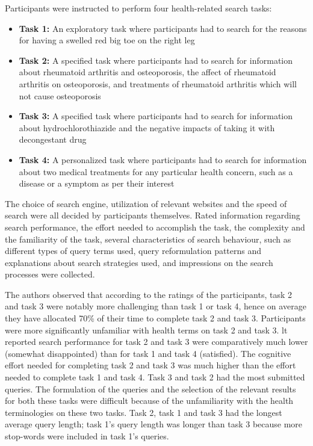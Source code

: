 \documentclass[]{article}
\begin{document}
\begin{enumerate}
Participants were instructed to perform four health-related search tasks: 

\begin{itemize}
	\item \textbf{Task 1:} An exploratory task where participants had to search for the reasons for having a swelled red big toe on the right leg
	
	\item \textbf{Task 2:} A specified task where participants had to search for information about rheumatoid arthritis and osteoporosis, the affect of rheumatoid arthritis on osteoporosis, and treatments of rheumatoid arthritis which will not cause osteoporosis
	
	\item \textbf{Task 3:} A specified task where participants had to search for information about hydrochlorothiazide and the negative impacts of taking it with decongestant drug   
	
	\item \textbf{Task 4:} A personalized task where participants had to search for information about two medical treatments for any particular health concern, such as a disease or a symptom as per their interest	
	
\end{itemize}

The choice of search engine, utilization of relevant websites and the speed of search were all decided by participants themselves. Rated information regarding search performance, the effort needed to accomplish the task, the complexity and the familiarity of the task, several characteristics of search behaviour, such as different types of query terms used, query reformulation patterns and explanations about search strategies used, and impressions on the search processes were collected. 

The authors observed that according to the ratings of the participants, task 2 and task 3 were notably more challenging than task 1 or task 4, hence on average they have allocated 70\% of their time  to complete task 2 and task 3. Participants were more significantly unfamiliar with health terms on task 2 and task 3. lt reported search performance for task 2 and task 3 were comparatively much lower (somewhat disappointed) than for task 1 and task 4 (satisfied). The cognitive effort needed for completing task 2 and task 3 was much higher than the effort needed to complete task 1 and task 4. Task 3 and task 2 had the most submitted queries. The formulation of the queries and the selection of the relevant results for both these tasks were difficult because of the unfamiliarity with the health terminologies on these two tasks. Task 2, task 1 and task 3 had the longest average query length; task 1's query length was longer than task 3 because more stop-words were included in task 1's queries. 


\end{enumerate}
\end{document}
